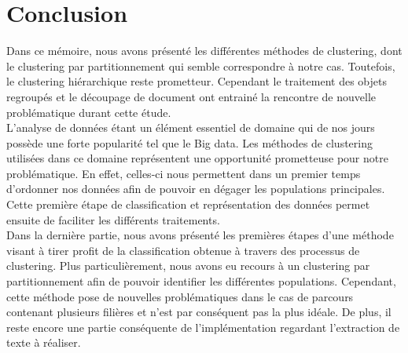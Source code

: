 \documentclass[memoire.tex]{subfiles}
\begin{document}
\section{Conclusion}
Dans ce mémoire, nous avons présenté les différentes méthodes de clustering, dont le clustering par partitionnement qui semble correspondre à notre cas. Toutefois, le clustering hiérarchique reste prometteur. Cependant le traitement des objets regroupés et le découpage de document ont entrainé la rencontre de nouvelle problématique durant cette étude.\\
L'analyse de données étant un élément essentiel de domaine qui de nos jours possède une forte popularité tel que le Big data. Les méthodes de clustering utilisées dans ce domaine représentent une opportunité prometteuse pour notre problématique. En effet, celles-ci nous permettent dans un premier temps d'ordonner nos données afin de pouvoir en dégager les populations principales. Cette première étape de classification et représentation des données permet ensuite de faciliter les différents traitements.\\
Dans la dernière partie, nous avons présenté les premières étapes d'une méthode visant à tirer profit de la classification obtenue à travers des processus de clustering. Plus particulièrement, nous avons eu recours à un clustering par partitionnement afin de pouvoir identifier les différentes populations. Cependant, cette méthode pose de nouvelles problématiques dans le cas de parcours contenant plusieurs filières et n'est par conséquent pas la plus idéale. De plus, il reste encore une partie conséquente de l'implémentation regardant l'extraction de texte à réaliser.
\end{document}
